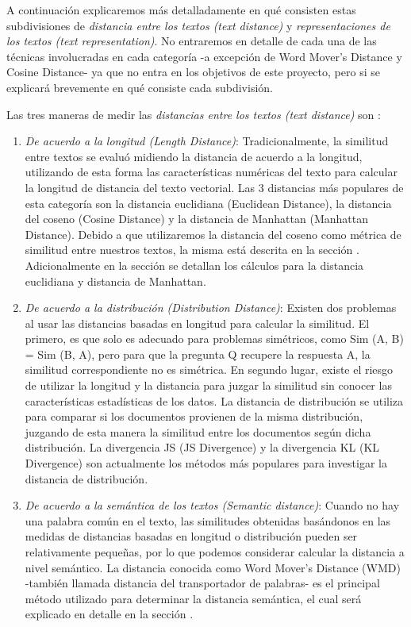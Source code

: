 \documentclass[12pt,a4paper]{article}
\begin{document}
\begin{sloppypar}
A continuación explicaremos más detalladamente en qué consisten estas subdivisiones de \textit{distancia entre los textos (text distance)} y \textit{representaciones de los textos (text representation)}. No entraremos en detalle de cada una de las técnicas involucradas en cada categoría -a excepción de Word Mover’s Distance y Cosine Distance- ya que no entra en los objetivos de este proyecto, pero si se explicará brevemente en qué consiste cada subdivisión.

Las tres maneras de medir las \textit{distancias entre los textos (text distance)} son \cite{similarity_survey}: 

\begin{enumerate}

\item \textit{De acuerdo a la longitud (Length Distance)}: Tradicionalmente, la similitud entre textos se evaluó midiendo la distancia de acuerdo a la longitud, utilizando de esta forma las características numéricas del texto para calcular la longitud de distancia del texto vectorial. Las 3 distancias más populares de esta categoría son la distancia euclidiana (Euclidean Distance), la distancia del coseno (Cosine Distance) y la distancia de Manhattan (Manhattan Distance). 
Debido a que utilizaremos la distancia del coseno como métrica de similitud entre nuestros textos, la misma está descrita en la sección \textit{}.
Adicionalmente en la sección \textit{} se detallan los cálculos para la distancia euclidiana y distancia de Manhattan.

\item \textit{De acuerdo a la distribución (Distribution Distance)}: Existen dos problemas al usar las distancias basadas en longitud para calcular la similitud. El primero, es que solo es adecuado para problemas simétricos, como Sim (A, B) = Sim (B, A), pero para que la pregunta Q recupere la respuesta A, la similitud correspondiente no es simétrica. En segundo lugar, existe el riesgo de utilizar la longitud y la distancia para juzgar la similitud sin conocer las características estadísticas de los datos\cite{WMD_2}. 
La distancia de distribución se utiliza para comparar si los documentos provienen de la misma distribución, juzgando de esta manera la similitud entre los documentos según dicha distribución. La divergencia JS (JS Divergence) y la divergencia KL (KL Divergence) son actualmente los métodos más populares para investigar la distancia de distribución.

\item \textit{De acuerdo a la semántica de los textos (Semantic distance)}: Cuando no hay una palabra común en el texto, las similitudes obtenidas basándonos en las medidas de distancias basadas en longitud o distribución pueden ser relativamente pequeñas, por lo que podemos considerar calcular la distancia a nivel semántico. La distancia conocida como Word Mover’s Distance (WMD) -también llamada distancia del transportador de palabras- es el principal método utilizado para determinar la distancia semántica\cite{wmd_paper}, el cual será explicado en detalle en la sección \textit{}.


\end{enumerate}
\end{sloppypar}
\end{document}
